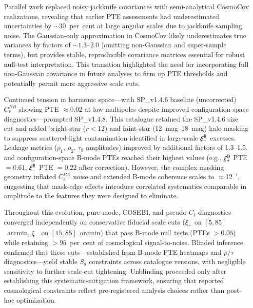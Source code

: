 \documentclass{aa}
\begin{document}
Parallel work replaced noisy jackknife covariances with semi-analytical CosmoCov realizations, revealing that earlier PTE assessments had underestimated uncertainties by $\sim$\num{30}~per~cent at large angular scales due to jackknife sampling noise. The Gaussian-only approximation in CosmoCov likely underestimates true variances by factors of $\sim 1.3$--$2.0$ (omitting non-Gaussian and super-sample terms), but provides stable, reproducible covariance matrices essential for robust null-test interpretation. This transition highlighted the need for incorporating full non-Gaussian covariance in future analyses to firm up PTE thresholds and potentially permit more aggressive scale cuts.

Continued tension in harmonic space—with SP\_v1.4.6 baseline (uncorrected) $C_\ell^{BB}$ showing PTE $\approx 0.02$ at low multipoles despite improved configuration-space diagnostics—prompted SP\_v1.4.8. This catalogue retained the SP\_v1.4.6 size cut and added bright-star ($r < 12$) and faint-star (\SIrange{12}{18}{mag}) halo masking to suppress scattered-light contamination identified in large-scale $\xi_-^{\rm B}$ excesses. Leakage metrics ($\rho_1$, $\rho_2$, $\tau_0$ amplitudes) improved by additional factors of \num{1.3}--\num{1.5}, and configuration-space B-mode PTEs reached their highest values (e.g., $\xi_+^{\rm B}$ PTE $= 0.61$, $\xi_-^{\rm B}$ PTE $= 0.22$ after correction). However, the complex masking geometry inflated $C_\ell^{BB}$ noise and extended B-mode coherence scales to $\approx$\SI{12}{\arcmin}, suggesting that mask-edge effects introduce correlated systematics comparable in amplitude to the features they were designed to eliminate.

Throughout this evolution, pure-mode, COSEBI, and pseudo-$C_\ell$ diagnostics converged independently on conservative fiducial scale cuts ($\xi_+$ on $[5, 85]$~arcmin, $\xi_-$ on $[15, 85]$~arcmin) that pass B-mode null tests (PTEs $> 0.05$) while retaining $> 95$~per~cent of cosmological signal-to-noise. Blinded inference confirmed that these cuts—established from B-mode PTE heatmaps and $\rho$/$\tau$ diagnostics—yield stable $S_8$ constraints across catalogue versions, with negligible sensitivity to further scale-cut tightening. Unblinding proceeded only after establishing this systematic-mitigation framework, ensuring that reported cosmological constraints \citep{goh.etal25} reflect pre-registered analysis choices rather than post-hoc optimization.

\end{document}
